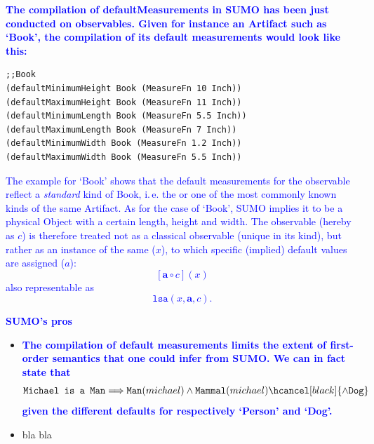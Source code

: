 \documentclass[11pt]{article}
\newcommand{\done}{\item[\checkmark]}
\begin{document}
\textbf{\textcolor{blue}{The compilation of defaultMeasurements in SUMO has been just conducted on observables. Given for instance an Artifact such as `Book', the compilation of its default measurements would look like this:}}

\begin{verbatim}
;;Book
(defaultMinimumHeight Book (MeasureFn 10 Inch))
(defaultMaximumHeight Book (MeasureFn 11 Inch))
(defaultMinimumLength Book (MeasureFn 5.5 Inch))
(defaultMaximumLength Book (MeasureFn 7 Inch))
(defaultMinimumWidth Book (MeasureFn 1.2 Inch))
(defaultMaximumWidth Book (MeasureFn 5.5 Inch))
\end{verbatim}


\textcolor{blue}{The example for `Book' shows that the default measurements for the observable reflect a \textit{standard} kind of Book, i.\,e. the or one of the most commonly known kinds of the same Artifact. As for the case of `Book', SUMO implies it to be a physical Object with a certain length, height and width. The observable (hereby as $c$) is therefore treated not as a classical observable (unique in its kind), but rather as an instance of the same ($x$), to which specific (implied) default values are assigned (\textbf{$a$}): \[ [\textbf{a} \circ c](x)\]also representable as \[ \texttt{lsa}(x, \textbf{a}, c).\]}


\textbf{\textcolor{blue}{SUMO's pros}}
\begin{itemize}[label=$\bar$]
\done \textbf{\textcolor{blue}{The compilation of default measurements limits the extent of first-order semantics that one could infer from SUMO. We can in fact state that  \[\texttt{Michael is a Man} \Longrightarrow \texttt{Man}(michael) \wedge \texttt{Mammal}(michael) \hcancel[black]{\wedge \texttt{Dog}}\] given the different defaults for respectively `Person' and `Dog'.}} 
\done bla bla 
\end{itemize}
\end{document}
